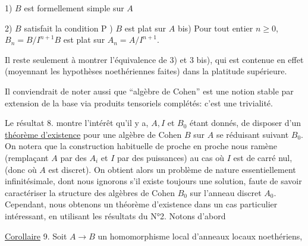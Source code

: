 
1) $B$ est formellement simple sur $A$

2) $B$ satisfait la condition P ) $B$ est plat sur $A$  bis) Pour tout
entier $n\geq0$, $B_n=B/I^{n+1}B$ est plat sur $A_n=A/I^{n+1}$. 

Il reste seulement à montrer l'équivalence de 3) et 3 bis), qui est
contenue en effet (moyennant les hypothèses noethériennes faites) dans
la platitude supérieure.

 Il conviendrait de noter aussi  que ``algèbre de
Cohen'' est une notion stable par extension de la base via produits tensoriels complétés: c'est une trivialité.

Le résultat 8. montre l'intérêt qu'il y a, $A,I$ et $B_0$ étant donnés,
de disposer d'un \uline{théorème d'existence} pour une algèbre de Cohen $B$ sur $A$
se réduisant suivant $B_0$. On notera que la construction habituelle de
proche en proche nous ramène (remplaçant $A$ par des $A_i$
et $I$ par des puissances) au cas où $I$ est de carré nul, (donc où $A$ est
discret). On obtient alors un problème de nature essentiellement infinitésimale,
dont nous ignorons s'il existe toujours une solution, faute de
savoir caractériser la structure des algèbres de Cohen $B_0$ sur l'anneau
discret $A_0$. Cependant, nous obtenons  un théorème d'existence dans
un cas particulier intéressant, en utilisant les résultats du N°2. Notons
d'abord


\uline{Corollaire} 9. Soit $A\longrightarrow B$ un homomorphisme local d'anneaux locaux noethériens,

